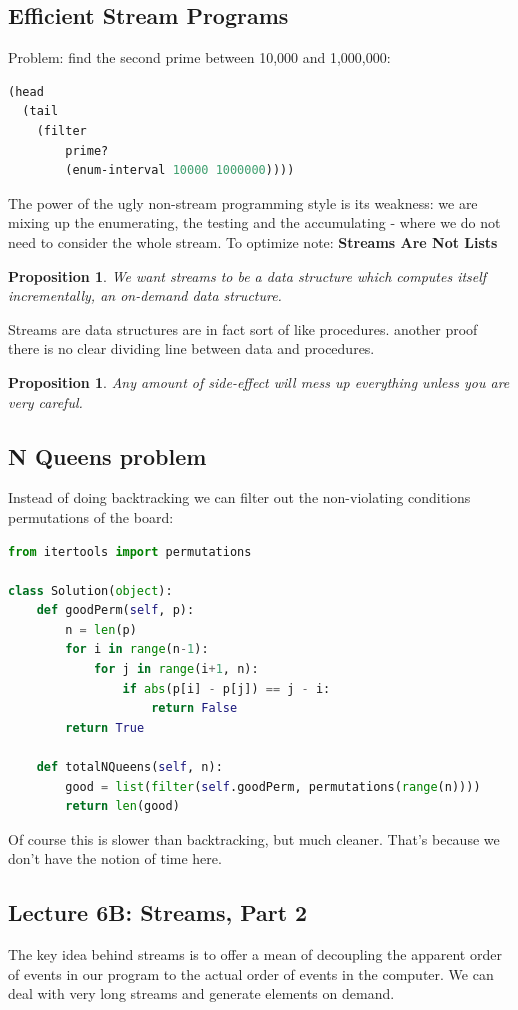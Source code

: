 \documentclass[a4paper,twoside]{article}
\newtheorem{proposition}[theorem]{Proposition}
\numberwithin{equation}{section}
\begin{document}
\subsection{Efficient Stream Programs}
Problem: find the second prime between 10,000 and 1,000,000:
\begin{lstlisting}[language=Lisp]
(head
  (tail
    (filter
        prime?
        (enum-interval 10000 1000000))))
\end{lstlisting}
The power of the ugly non-stream programming style is its weakness: we are mixing up the enumerating,
the testing and the accumulating - where we do not need to consider the whole stream. To optimize note:
\textbf{Streams Are Not Lists}
\begin{proposition}
    We want streams to be a data structure which computes itself incrementally, an on-demand data structure.
\end{proposition}
Streams are data structures are in fact sort of like procedures. another proof there is no clear dividing
line between data and procedures.

\begin{proposition}
    Any amount of side-effect will mess up everything unless you are very careful.
\end{proposition}


\subsection{N Queens problem}
Instead of doing backtracking we can filter out the non-violating conditions permutations of the board:

\begin{lstlisting}[language=Python]
from itertools import permutations

class Solution(object):
    def goodPerm(self, p):
        n = len(p)
        for i in range(n-1):
            for j in range(i+1, n):
                if abs(p[i] - p[j]) == j - i:
                    return False
        return True
    
    def totalNQueens(self, n):
        good = list(filter(self.goodPerm, permutations(range(n))))
        return len(good)
\end{lstlisting}
Of course this is slower than backtracking, but much cleaner. That's because we don't have the notion
of time here.

\subsection{Lecture 6B: Streams, Part 2}
The key idea behind streams is to offer a mean of decoupling the apparent
order of events in our program to the actual order of events in the computer.
We can deal with very long streams and generate elements on demand.
\end{document}
